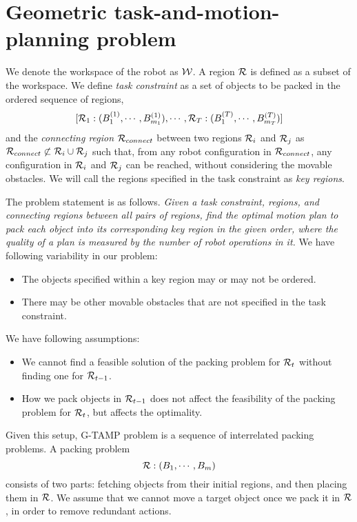 \documentclass[10pt,letterpaper]{article}
\begin{document}
\iffalse
\section{Geometric task-and-motion-planning problem}
We denote the workspace of the robot as $\mathcal{W}$. A region $\mathcal{R}$ is
defined as a subset of the workspace. We define \emph{task constraint} as a set of objects 
 to be packed in the ordered sequence of regions,
$$[\mathcal{R}_1:(B^{(1)}_1,\cdots,B^{(1)}_{m_1}), \cdots, 
\mathcal{R}_T:(B^{(T)}_1,\cdots,B^{(T)}_{m_T})]$$ and the \emph{connecting region}
$\mathcal{R}_{connect}$ between two regions $\mathcal{R}_i$ and $\mathcal{R}_j$ as
$\mathcal{R}_{connect} \not\subset \mathcal{R}_i \cup \mathcal{R}_j$ such that,
 from any robot configuration in $\mathcal{R}_{connect}$, any configuration
in  $\mathcal{R}_i$ and $\mathcal{R}_j$ can be reached, 
without considering the movable obstacles. We will call the regions
specified in the task constraint as \emph{key regions}.


The problem statement is as follows. \emph{Given a task constraint, regions, and connecting 
regions between all pairs of regions, find the optimal motion plan to 
pack each object into its corresponding
key region in the given order, where the quality of a plan is measured by the number of
robot operations in it.}  We have following variability in our problem:
\begin{itemize}
\item The objects specified within a key region may or may not be ordered.
\item There may be other movable obstacles that are not specified in the task constraint.
\end{itemize}
We have following assumptions:
\begin{itemize}
\item We cannot find a feasible solution of the packing problem for $\mathcal{R}_{t}$ without
finding one for $\mathcal{R}_{t-1}$.
\item How we pack objects in $\mathcal{R}_{t-1}$ does not affect the
feasibility of the packing problem for $\mathcal{R}_{t}$, but affects the optimality.
\end{itemize}

Given this setup, G-TAMP problem is a sequence of interrelated packing problems. 
A packing problem
$$\mathcal{R}: (B_1,\cdots,B_{m})$$
consists of two parts: fetching objects from their initial regions, and
then placing them in $\mathcal{R}$. We assume that we cannot move a target
object once we pack it in $\mathcal{R}$, in order to remove redundant actions.
\end{document}
